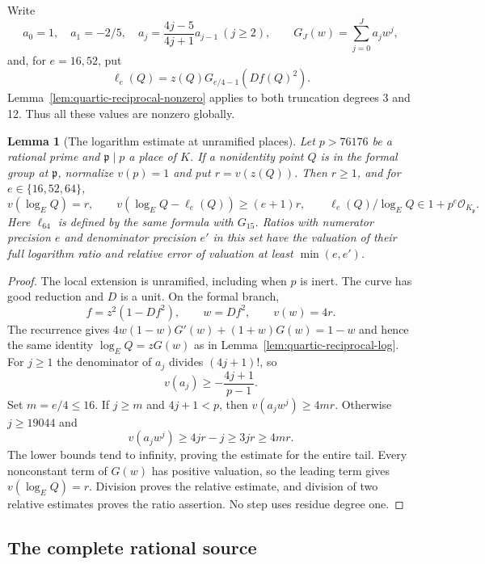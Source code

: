 \documentclass[11pt]{article}
\newtheorem{lemma}[theorem]{Lemma}
\theoremstyle{definition}
\theoremstyle{remark}
\begin{document}
Write
\[
 a_0=1,\quad a_1=-2/5,\quad
 a_j=\frac{4j-5}{4j+1}a_{j-1}\ (j\ge2),\qquad
 G_J(w)=\sum_{j=0}^J a_jw^j,
\]
and, for $e=16,52$, put
\begin{equation}\label{eq:v5-log}
 \ell_e(Q)=z(Q)G_{e/4-1}(Df(Q)^2).
\end{equation}
Lemma~\ref{lem:quartic-reciprocal-nonzero} applies to both truncation
degrees 3 and 12. Thus all these values are nonzero globally.

\begin{lemma}[The logarithm estimate at unramified places]
\label{lem:v5-unramified-log}
Let $p>76176$ be a rational prime and $\mathfrak p\mid p$ a place
of $K$. If a nonidentity point $Q$ is in the formal group at
$\mathfrak p$, normalize $v(p)=1$ and put $r=v(z(Q))$. Then $r\ge1$,
and for $e\in\{16,52,64\}$,
\[
 v(\log_E Q)=r,\qquad
 v(\log_E Q-\ell_e(Q))\ge(e+1)r,\qquad
 \ell_e(Q)/\log_E Q\in1+p^e\mathcal O_{K_{\mathfrak p}}.
\]
Here $\ell_{64}$ is defined by the same formula with $G_{15}$.
Ratios with numerator precision $e$ and denominator precision $e'$
in this set have the valuation of their full logarithm ratio and
relative error of valuation at least $\min(e,e')$.
\end{lemma}
\begin{proof}
The local extension is unramified, including when $p$ is inert.
The curve has good reduction and $D$ is a unit. On the formal branch,
\[
 f=z^2(1-Df^2),\qquad w=Df^2,\qquad v(w)=4r.
\]
The recurrence gives
$4w(1-w)G'(w)+(1+w)G(w)=1-w$ and hence the same identity
$\log_E Q=zG(w)$ as in Lemma~\ref{lem:quartic-reciprocal-log}.
For $j\ge1$ the denominator of $a_j$ divides $(4j+1)!$, so
\[
 v(a_j)\ge-\frac{4j+1}{p-1}.
\]
Set $m=e/4\le16$. If $j\ge m$ and $4j+1<p$, then
$v(a_jw^j)\ge4mr$. Otherwise $j\ge19044$ and
\[
 v(a_jw^j)\ge4jr-j\ge3jr\ge4mr.
\]
The lower bounds tend to infinity, proving the estimate for the
entire tail. Every nonconstant term of $G(w)$ has positive valuation,
so the leading term gives $v(\log_E Q)=r$. Division proves the
relative estimate, and division of two relative estimates proves
the ratio assertion. No step uses residue degree one.
\end{proof}

\subsection{The complete rational source}
\label{subsec:v5-complete-source}
\end{document}

